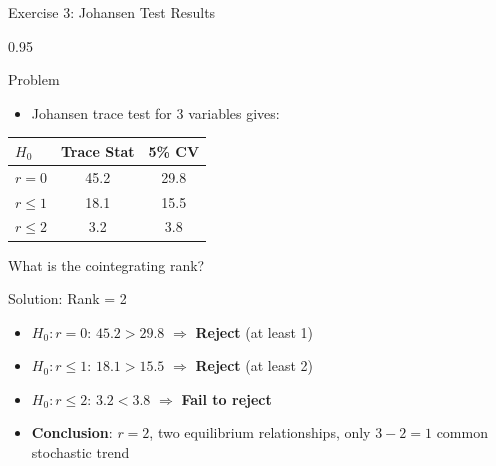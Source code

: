 \documentclass[9pt, aspectratio=169, t]{beamer}
\begin{document}
\begin{frame}{Exercise 3: Johansen Test Results}
    \begin{cminipage}{0.95\textwidth}
    {\small
    \begin{alertblock}{Problem}
        \begin{itemize}\setlength{\itemsep}{0pt}
            \item Johansen trace test for 3 variables gives:
        \end{itemize}
        \begin{center}
        \begin{tabular}{lcc}
            \toprule
            $H_0$ & Trace Stat & 5\% CV \\
            \midrule
            $r = 0$ & 45.2 & 29.8 \\
            $r \leq 1$ & 18.1 & 15.5 \\
            $r \leq 2$ & 3.2 & 3.8 \\
            \bottomrule
        \end{tabular}
        \end{center}
        What is the cointegrating rank?
    \end{alertblock}

    \vspace{0.1cm}
    \begin{exampleblock}{Solution: Rank = 2}
        \begin{itemize}\setlength{\itemsep}{0pt}
            \item $H_0: r = 0$: $45.2 > 29.8$ $\Rightarrow$ \textbf{Reject} (at least 1)
            \item $H_0: r \leq 1$: $18.1 > 15.5$ $\Rightarrow$ \textbf{Reject} (at least 2)
            \item $H_0: r \leq 2$: $3.2 < 3.8$ $\Rightarrow$ \textbf{Fail to reject}
            \item \textbf{Conclusion}: $r = 2$, two equilibrium relationships, only $3 - 2 = 1$ common stochastic trend
        \end{itemize}
    \end{exampleblock}
    }
    \end{cminipage}
\end{frame}

\end{document}
